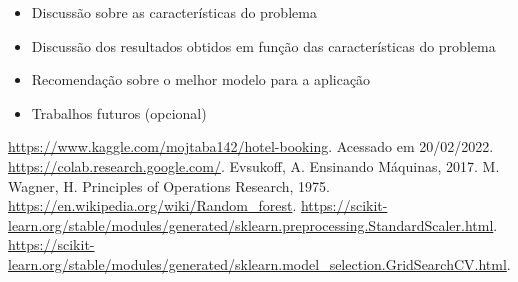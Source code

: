 \documentclass{homework}
\begin{document}
\begin{itemize}
    \color{red}
        \item Discussão sobre as características do problema
        \item Discussão dos resultados obtidos em função das características do problema
        \item Recomendação sobre o melhor modelo para a aplicação
        \item Trabalhos futuros (opcional)
\end{itemize}

\begin{thebibliography}{1}
     \url{https://www.kaggle.com/mojtaba142/hotel-booking}. Acessado em 20/02/2022.
     \url{https://colab.research.google.com/}.
     Evsukoff, A. Ensinando Máquinas, 2017.
     M. Wagner, H. Principles of Operations Research, 1975.
     \url{https://en.wikipedia.org/wiki/Random_forest}.
     \url{https://scikit-learn.org/stable/modules/generated/sklearn.preprocessing.StandardScaler.html}.
     \url{https://scikit-learn.org/stable/modules/generated/sklearn.model_selection.GridSearchCV.html}.
\end{thebibliography}
\end{document}
